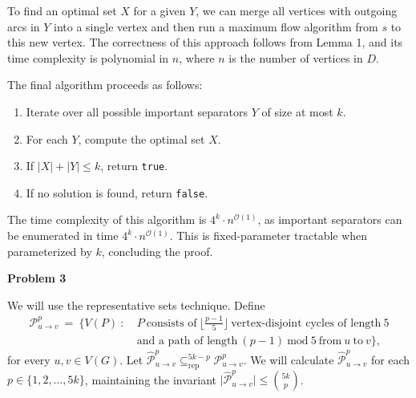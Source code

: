 \documentclass[12pt]{article}
\begin{document}
	\medskip
	
	To find an optimal set \(X\) for a given \(Y\), we can merge all vertices
	with outgoing arcs in \(Y\) into a single vertex and then run a maximum flow
	algorithm from \(s\) to this new vertex. The correctness of this approach
	follows from Lemma 1, and its time complexity is polynomial in \(n\), where
	\(n\) is the number of vertices in \(D\).
	
	\medskip
	
	The final algorithm proceeds as follows:
	\begin{enumerate}
		\item Iterate over all possible important separators \(Y\) of size at
		      most \(k\).
		\item For each \(Y\), compute the optimal set \(X\).
		\item If \(|X| + |Y| \leqslant k\), return \texttt{true}.
		\item If no solution is found, return \texttt{false}.
	\end{enumerate}
	The time complexity of this algorithm is \(4^{k} \cdot n^{\mathcal{O}(1)}\),
	as important separators can be enumerated in time \(4^{k} \cdot
	n^{\mathcal{O}(1)}\). This is fixed-parameter tractable when parameterized
	by \(k\), concluding the proof.
	
	\newpage
	
	\textbf{Problem 3}
	
	\medskip
	
	We will use the representative sets technique. Define
	\begin{align*}
		\mathcal{P}_{u \to v}^{p} \ = \ \big\{ V(P) \ : \ &P \
		\text{consists of} \ \big\lfloor \tfrac{p - 1}{5} \big\rfloor \
		\text{vertex-disjoint cycles of length} \ 5 \\
		&\text{and a path of length} \ (p - 1) \ \text{mod} \ 5 \ \text{from} \
		u \ \text{to} \ v \big\} \text{,}
	\end{align*}
	for every \(u, v \in V(G)\). Let \(\widehat{\mathcal{P}}_{u \to v}^{p}
	\subseteq_{\text{rep}}^{5k - p} \mathcal{P}_{u \to v}^{p}\). We will
	calculate \(\widehat{\mathcal{P}}_{u \to v}^{p}\) for each \(p \in \{1, 2,
	\ldots, 5k\}\), maintaining the invariant \(\big|
	\widehat{\mathcal{P}}_{u \to v}^{p} \big| \leqslant \binom{5k}{p}\).
	
	\medskip
	
\end{document}

